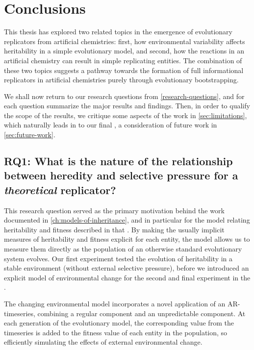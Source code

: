 \chapter{Conclusions}\label{ch:thesis-conclusions}

This thesis has explored two related topics in the emergence of evolutionary replicators from artificial chemistries: first, how environmental variability affects heritability in a simple evolutionary model, and second, how the reactions in an artificial chemistry can result in simple replicating entities. The combination of these two topics suggests a pathway towards the formation of full informational replicators in artificial chemistries purely through evolutionary bootstrapping.

We shall now return to our research questions from \cref{research-questions}, and for each question summarize the major results and findings. Then, in order to qualify the scope of the results, we critique some aspects of the work in \cref{sec:limitations}, which naturally leads in to our final , a consideration of future work in \cref{sec:future-work}.

\section{RQ1: What is the nature of the relationship between heredity and selective pressure for a \emph{theoretical} replicator?}

This research question served as the primary motivation behind the work documented in \cref{ch:models-of-inheritance}, and in particular for the model relating heritability and fitness described in that . By making the usually implicit measures of heritability and fitness explicit for each entity, the model allows us to measure them directly as the population of an otherwise standard evolutionary system evolves. Our first experiment tested the evolution of heritability in a stable environment (without external selective pressure), before we introduced an explicit model of environmental change for the second and final experiment in the . 

The changing environmental model incorporates a novel application of an AR-timeseries, combining a regular component and an unpredictable component. At each generation of the evolutionary model, the corresponding value from the timeseries is added to the fitness value of each entity in the population, so efficiently simulating the effects of external environmental change.

